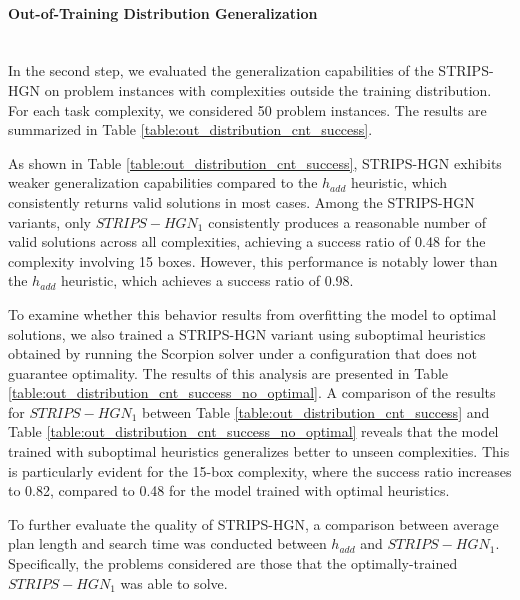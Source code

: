 \paragraph*{Out-of-Training Distribution Generalization} \mbox{}\\
In the second step, we evaluated the generalization capabilities of the STRIPS-HGN on problem instances with complexities outside the training distribution. For each task complexity, we considered 50 problem instances. The results are summarized in Table \ref{table:out_distribution_cnt_success}.



As shown in Table \ref{table:out_distribution_cnt_success}, STRIPS-HGN exhibits weaker generalization capabilities compared to the  $h_{add}$ heuristic, which consistently returns valid solutions in most cases. Among the STRIPS-HGN variants, only $ STRIPS-HGN_1 $ consistently produces a reasonable number of valid solutions across all complexities, achieving a success ratio of 0.48 for the complexity involving 15 boxes. However, this performance is notably lower than the $ h_{add} $ heuristic, which achieves a success ratio of 0.98.

To examine whether this behavior results from overfitting the model to optimal solutions, we also trained a STRIPS-HGN variant using suboptimal heuristics obtained by running the Scorpion solver under a configuration that does not guarantee optimality. The results of this analysis are presented in Table \ref{table:out_distribution_cnt_success_no_optimal}. A comparison of the results for $ STRIPS-HGN_1 $ between Table \ref{table:out_distribution_cnt_success} and Table \ref{table:out_distribution_cnt_success_no_optimal} reveals that the model trained with suboptimal heuristics generalizes better to unseen complexities. This is particularly evident for the 15-box complexity, where the success ratio increases to 0.82, compared to 0.48 for the model trained with optimal heuristics.



To further evaluate the quality of STRIPS-HGN, a comparison between average plan length and search time was conducted between $h_{add}$ and $STRIPS-HGN_{1}$. Specifically, the problems considered are those that the optimally-trained $STRIPS-HGN_{1}$ was able to solve.




